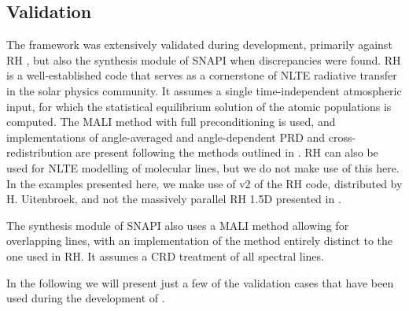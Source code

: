 \subsection{Validation}\label{Sec:LwValidation}

The \Lw{} framework was extensively validated during development, primarily against RH \citep{Uitenbroek2001}, but also the synthesis module of SNAPI \citep{Milic2018} when discrepancies were found.
RH is a well-established code that serves as a cornerstone of NLTE radiative transfer in the solar physics community.
It assumes a single time-independent atmospheric input, for which the statistical equilibrium solution of the atomic populations is computed.
The MALI method with full preconditioning \citep{Rybicki1992} is used, and implementations of angle-averaged and angle-dependent PRD and cross-redistribution are present following the methods outlined in \citet{Uitenbroek2001,MillerRicci2002}.
RH can also be used for NLTE modelling of molecular lines, but we do not make use of this here.
In the examples presented here, we make use of v2 of the RH code, distributed by H. Uitenbroek, and not the massively parallel RH 1.5D presented in \citet{Pereira2015}.

The synthesis module of SNAPI also uses a MALI method allowing for overlapping lines, with an implementation of the method entirely distinct to the one used in RH.
It assumes a CRD treatment of all spectral lines.

In the following we will present just a few of the validation cases that have been used during the development of \Lw{}.

